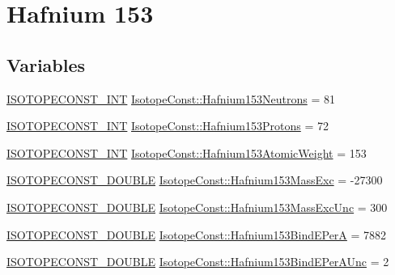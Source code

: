 \hypertarget{group___isotope_const-_hafnium-_hf153}{}\section{Hafnium 153}
\label{group___isotope_const-_hafnium-_hf153}
\subsection*{Variables}
\begin{DoxyCompactItemize}
\item 
\mbox{\hyperlink{group___isotope_const-_macros_ga5f18360b3e99483a35c32d789e62621c}{I\+S\+O\+T\+O\+P\+E\+C\+O\+N\+S\+T\+\_\+\+I\+NT}} \mbox{\hyperlink{group___isotope_const-_hafnium-_hf153_gaff8d6baf53cd5f2fe7b3f9619e452195}{Isotope\+Const\+::\+Hafnium153\+Neutrons}} = 81
\item 
\mbox{\hyperlink{group___isotope_const-_macros_ga5f18360b3e99483a35c32d789e62621c}{I\+S\+O\+T\+O\+P\+E\+C\+O\+N\+S\+T\+\_\+\+I\+NT}} \mbox{\hyperlink{group___isotope_const-_hafnium-_hf153_gab0f8e78c03788f561bb9b9680500d7d9}{Isotope\+Const\+::\+Hafnium153\+Protons}} = 72
\item 
\mbox{\hyperlink{group___isotope_const-_macros_ga5f18360b3e99483a35c32d789e62621c}{I\+S\+O\+T\+O\+P\+E\+C\+O\+N\+S\+T\+\_\+\+I\+NT}} \mbox{\hyperlink{group___isotope_const-_hafnium-_hf153_ga8e547bf3f6c26dd9dbd3f74e892903e1}{Isotope\+Const\+::\+Hafnium153\+Atomic\+Weight}} = 153
\item 
\mbox{\hyperlink{group___isotope_const-_macros_ga8f45a7272ce02c0b4c65c44636ed719a}{I\+S\+O\+T\+O\+P\+E\+C\+O\+N\+S\+T\+\_\+\+D\+O\+U\+B\+LE}} \mbox{\hyperlink{group___isotope_const-_hafnium-_hf153_ga3605cd9be2d50f8f7aff22da14bacecf}{Isotope\+Const\+::\+Hafnium153\+Mass\+Exc}} = -\/27300
\item 
\mbox{\hyperlink{group___isotope_const-_macros_ga8f45a7272ce02c0b4c65c44636ed719a}{I\+S\+O\+T\+O\+P\+E\+C\+O\+N\+S\+T\+\_\+\+D\+O\+U\+B\+LE}} \mbox{\hyperlink{group___isotope_const-_hafnium-_hf153_ga6986161cf2350d023548b78851e3dd7b}{Isotope\+Const\+::\+Hafnium153\+Mass\+Exc\+Unc}} = 300
\item 
\mbox{\hyperlink{group___isotope_const-_macros_ga8f45a7272ce02c0b4c65c44636ed719a}{I\+S\+O\+T\+O\+P\+E\+C\+O\+N\+S\+T\+\_\+\+D\+O\+U\+B\+LE}} \mbox{\hyperlink{group___isotope_const-_hafnium-_hf153_ga3fcd11fdf1a47e38131eb7b7e41b7416}{Isotope\+Const\+::\+Hafnium153\+Bind\+E\+PerA}} = 7882
\item 
\mbox{\hyperlink{group___isotope_const-_macros_ga8f45a7272ce02c0b4c65c44636ed719a}{I\+S\+O\+T\+O\+P\+E\+C\+O\+N\+S\+T\+\_\+\+D\+O\+U\+B\+LE}} \mbox{\hyperlink{group___isotope_const-_hafnium-_hf153_ga9d4b8c6040b19f8692606e9a93733e0e}{Isotope\+Const\+::\+Hafnium153\+Bind\+E\+Per\+A\+Unc}} = 2

\end{DoxyCompactItemize}
